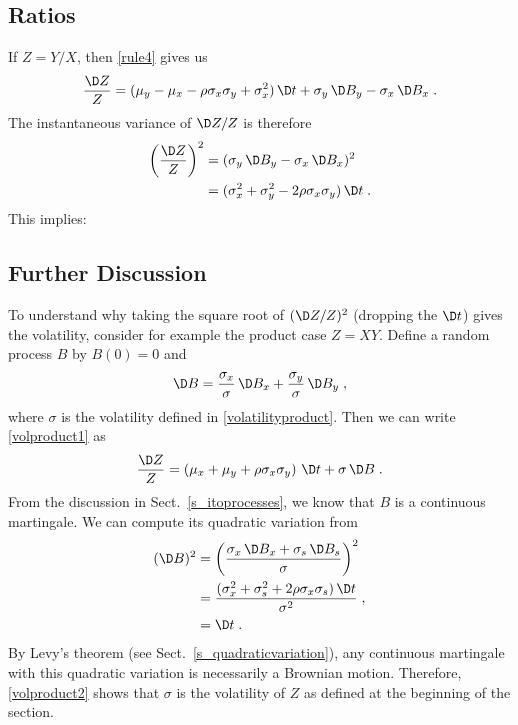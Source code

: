 \subsection*{Ratios}
If $Z=Y/X$, then \eqref{rule4} gives us
\begin{equation}\label{ratioproduct1}
\frac{\D Z}{Z} = (\mu_y-\mu_x-\rho\sigma_x\sigma_y+\sigma_x^2)\,\D t + \sigma_y\,\D B_y - \sigma_x\,\D B_x\;.
\end{equation}
The instantaneous variance of $\D Z/Z$ is therefore
\begin{align*}
\left(\frac{\D Z}{Z}\right)^2 &= (\sigma_y\,\D B_y - \sigma_x\,\D B_x)^2\\
&= (\sigma_x^2 + \sigma_y^2 - 2\rho\sigma_x\sigma_y)\,\D t\;.
\end{align*}
This implies:


\subsection*{Further Discussion}
To understand why taking the square root of $(\D Z/Z)^2$ (dropping the $\D t$) gives the volatility, consider for example the product case $Z=XY$.  Define a random process $B$ by $B(0)=0$ and 
\begin{equation}\label{foreigndB}
\D B = \frac{\sigma_x}{\sigma}\,\D B_x + \frac{\sigma_y}{\sigma}\,\D B_y\;,
\end{equation}
where $\sigma$ is the volatility defined in \eqref{volatilityproduct}.
Then we can write  \eqref{volproduct1} as
\begin{equation}\label{volproduct2}
\frac{\D Z}{Z} = \left(\mu_x +\mu_y+ \rho\sigma_x\sigma_y\right)\,\D t + \sigma\,\D B\;.\end{equation}
From the discussion in Sect.~\ref{s_itoprocesses}, we know that $B$ is a continuous martingale.  We can compute its quadratic variation from
\begin{align*}
(\D B)^2 &= \left(\frac{\sigma_x\,\D B_x + \sigma_s\,\D B_s}{\sigma}\right)^2\\
&= \frac{(\sigma_x^2 + \sigma_s^2 + 2\rho\sigma_x\sigma_s)\,\D t}{\sigma^2}\; ,\\
&= \D t\;.
\end{align*}
By Levy's theorem (see Sect.~\ref{s_quadraticvariation}), any continuous martingale with this quadratic variation is necessarily a Brownian motion.  Therefore,  \eqref{volproduct2} shows that $\sigma$ is the volatility of $Z$ as defined at the beginning of the section.

